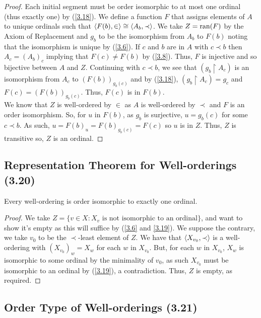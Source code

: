 \begin{proof}
    Each initial segment must be order isomorphic to at most one
    ordinal (thus exactly one) by (\ref{3.18}). We define a 
    function $F$ that assigns elements of $A$ to unique ordinals
    such that ${\langle F(b), \in \rangle} \cong {\langle A_b, \prec \rangle}$.
    We take $Z = \operatorname{ran}(F)$ by the Axiom of Replacement and
    $g_b$ to be the isomorphism from $A_b$ to $F(b)$ noting that 
    the isomorphism is unique by (\ref{3.6}). If $c$ and $b$ are 
    in $A$ with $c \prec b$ then $A_c = (A_b)_c$ implying that
    $F(c) \neq F(b)$ by (\ref{3.8}).
    Thus, $F$ is injective and so bijective between $A$ and $Z$.
    Continuing with $c \prec b$, we see that $(g_b \upharpoonright A_c)$
    is an isomorphism from $A_c$ to $(F(b))_{g_b(c)}$ and by (\ref{3.18}),
    $(g_b \upharpoonright A_c) = g_c$ and $F(c) = (F(b))_{g_b(c)}$.
    Thus, $F(c)$ is in $F(b)$.
    \\[\baselineskip]
    We know that $Z$ is well-ordered by $\in$ as 
    $A$ is well-ordered by $\prec$ and $F$ is an
    order isomorphism. So, for $u$ in $F(b)$,
    as $g_b$ is surjective, $u = g_b(c)$ for some $c \prec b$.
    As such, $u = F(b)_u = F(b)_{g_b(c)} = F(c)$ so $u$ is
    in $Z$. Thus, $Z$ is transitive so, $Z$ is an ordinal.
\end{proof}

\subsection{Representation Theorem for Well-orderings (3.20)} \label{3.20}

Every well-ordering is order isomorphic to exactly one ordinal.

\begin{proof}
    We take $Z = \{v \in X : X_v \text{ is not isomorphic to an ordinal}\}$,
    and want to show it's empty as this will suffice by (\ref{3.6} and \ref{3.19}). 
    We suppose the contrary, we take $v_0$ to be the $\prec$-least element
    of $Z$. We have that ${\langle X_{v_0}, \prec \rangle}$ is a well-ordering
    with $(X_{v_0})_w = X_w$ for each $w$ in $X_{v_0}$.
    But, for each $w$ in $X_{v_0}$, $X_w$ is isomorphic to some ordinal
    by the minimality of $v_0$, as such $X_{v_0}$ must be isomorphic
    to an ordinal by (\ref{3.19}), a contradiction. 
    Thus, $Z$ is empty, as required.
\end{proof}

\subsection{Order Type of Well-orderings (3.21)} \label{3.21}

